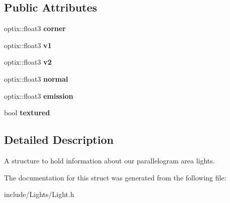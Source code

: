 \subsection*{Public Attributes}
\begin{DoxyCompactItemize}
\item 
\hypertarget{struct_light_1_1_parallelogram_light_aef1641932d825e8f721973e50a90b8b8}{optix\-::float3 {\bfseries corner}}\label{struct_light_1_1_parallelogram_light_aef1641932d825e8f721973e50a90b8b8}

\item 
\hypertarget{struct_light_1_1_parallelogram_light_a2c6f7f394bfa0a299e50990e09945903}{optix\-::float3 {\bfseries v1}}\label{struct_light_1_1_parallelogram_light_a2c6f7f394bfa0a299e50990e09945903}

\item 
\hypertarget{struct_light_1_1_parallelogram_light_ab834c176bd95ef7d37e55a8ec9411fae}{optix\-::float3 {\bfseries v2}}\label{struct_light_1_1_parallelogram_light_ab834c176bd95ef7d37e55a8ec9411fae}

\item 
\hypertarget{struct_light_1_1_parallelogram_light_a829cbc9fd5260ed5af6a0d55ae36b056}{optix\-::float3 {\bfseries normal}}\label{struct_light_1_1_parallelogram_light_a829cbc9fd5260ed5af6a0d55ae36b056}

\item 
\hypertarget{struct_light_1_1_parallelogram_light_a0ecfbc6f75d6949798e5e6aece1cabac}{optix\-::float3 {\bfseries emission}}\label{struct_light_1_1_parallelogram_light_a0ecfbc6f75d6949798e5e6aece1cabac}

\item 
\hypertarget{struct_light_1_1_parallelogram_light_ad036a50f73f95da31cdfbc5bf36e3b08}{bool {\bfseries textured}}\label{struct_light_1_1_parallelogram_light_ad036a50f73f95da31cdfbc5bf36e3b08}

\end{DoxyCompactItemize}


\subsection{Detailed Description}
A structure to hold information about our parallelogram area lights. 

The documentation for this struct was generated from the following file\-:\begin{DoxyCompactItemize}
\item 
include/\-Lights/Light.\-h\end{DoxyCompactItemize}
